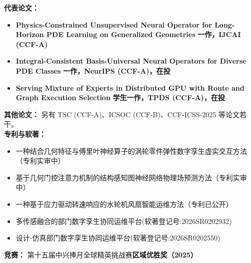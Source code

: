 \documentclass[11pt]{article}
\begin{document}
\textbf{代表论文：}
\begin{itemize}[leftmargin=1.6em]
    \item \textbf{Physics-Constrained Unsupervised Neural Operator for Long-Horizon PDE Learning on Generalized Geometries} \textcolor{CVBlue}{\textbf{一作，IJCAI (CCF-A)}}
    \item \textbf{Integral-Consistent Basis-Universal Neural Operators for Diverse PDE Classes} \textcolor{CVBlue}{\textbf{一作，NeurIPS (CCF-A)，在投}}
    \item \textbf{Serving Mixture of Experts in Distributed GPU with Route and Graph Execution Selection} \textcolor{CVBlue}{\textbf{学生一作，TPDS (CCF-A)，在投}}
\end{itemize}
\textbf{其他论文：} 另有 TSC (CCF-A)、ICSOC (CCF-B)、CCF-ICSS-2025 等论文若干。\\
\textbf{专利与软著：}
\begin{itemize}[leftmargin=1.6em]
    \item 一种结合几何特征与傅里叶神经算子的涡轮零件弹性数字孪生虚实交互方法（专利实审中）
    \item 基于几何门控注意力机制的结构感知图神经网络物理场预测方法（专利实审中）
    \item 一种基于应力驱动转速响应的水轮机风扇智能运维方法（专利已公开）
    \item 多传感融合的部门数字孪生协同运维平台(软著登记号:2026SR0202932)
    \item 设计-仿真部门数字孪生协同运维平台(软著登记号:2026SR0202550)
\end{itemize}

\textbf{竞赛：} 第十五届中兴捧月全球精英挑战赛\textbf{区域优胜奖（2025）}

  
\end{document}
